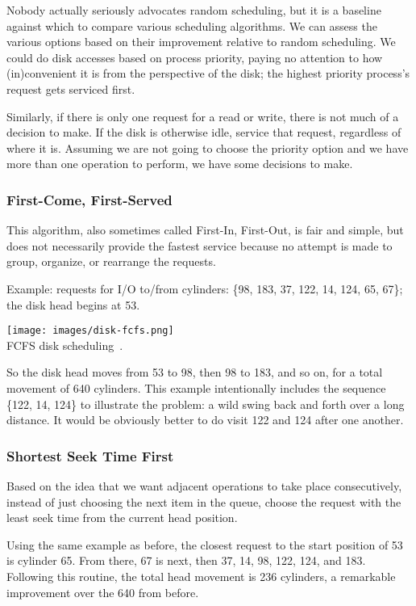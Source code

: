 Nobody actually seriously advocates random scheduling, but it is a baseline against which to compare various scheduling algorithms. We can assess the various options based on their improvement relative to random scheduling. We could do disk accesses based on process priority, paying no attention to how (in)convenient it is from the perspective of the disk; the highest priority process's request gets serviced first. 

Similarly, if there is only one request for a read or write, there is not much of a decision to make. If the disk is otherwise idle, service that request, regardless of where it is. Assuming we are not going to choose the priority option and we have more than one operation to perform, we have some decisions to make.

\subsubsection*{First-Come, First-Served}
This algorithm, also sometimes called First-In, First-Out, is fair and simple, but does not necessarily provide the fastest service because no attempt is made to group, organize, or rearrange the requests.

Example: requests for I/O to/from cylinders: \{98, 183, 37, 122, 14, 124, 65, 67\}; the disk head begins at 53.

\begin{center}
	\texttt{[image: images/disk-fcfs.png]}\\
	FCFS disk scheduling~\cite{osc}.
\end{center}

So the disk head moves from 53 to 98, then 98 to 183, and so on, for a total movement of 640 cylinders. This example intentionally includes the sequence \{122, 14, 124\} to illustrate the problem: a wild swing back and forth over a long distance. It would be obviously better to do visit 122 and 124 after one another. 

\subsubsection*{Shortest Seek Time First}
Based on the idea that we want adjacent operations to take place consecutively, instead of just choosing the next item in the queue, choose the request with the least seek time from the current head position.

Using the same example as before, the closest request to the start position of 53 is cylinder 65. From there, 67 is next, then 37, 14, 98, 122, 124, and 183. Following this routine, the total head movement is 236 cylinders, a remarkable improvement over the 640 from before.

